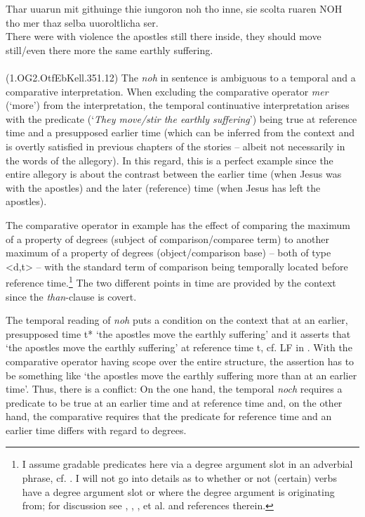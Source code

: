 \documentclass[output=paper,
modfonts
]{langscibook}
\begin{document}
\ea\gll Thar uuarun mit githuinge thie iungoron noh tho inne, sie scolta ruaren NOH tho mer thaz selba uuoroltlicha ser.\\
       There were with violence the apostles still there inside, they should move still/even there more the same earthly suffering.\\
\label{OG2_noch_mehr_ruehren} \\ (1.OG2.OtfEbKell.351.12)
\z
The \textit{noh} in sentence  is ambiguous to a temporal and a comparative interpretation. When excluding the comparative operator \textit{mer} (`more') from the interpretation, the temporal continuative interpretation arises with the predicate (`\textit{They move/stir the earthly suffering}') being true at reference time and a presupposed earlier time (which can be inferred from the context and is overtly satisfied in previous chapters of the stories -- albeit not necessarily in the words of the allegory). In this regard, this is a perfect example since the entire allegory is about the contrast between the earlier time (when Jesus was with the apostles) and the later (reference) time (when Jesus has left the apostles). 

The comparative operator in example  has the effect of comparing the maximum of a property of degrees (subject of comparison/comparee term) to another maximum of a property of degrees (object/comparison base) -- both of type <d,t> -- with the standard term of comparison being temporally located before reference time.\footnote{ I assume gradable predicates here via a degree argument slot in an adverbial phrase, cf. . I will not go into details as to whether or not (certain) verbs have a degree argument slot or where the degree argument is originating from; for discussion see \citeauthor{pinon2008} \citeyearpar{pinon2008}, \citeauthor{rett2013} \citeyearpar{rett2013}, \citeauthor{kennedy_mcnally2005} \citeyearpar{kennedy_mcnally2005}, \citeauthor{kennedy2012} \citeyearpar{kennedy2012} et al. and references therein.} The two different points in time are provided by the context since the \textit{than}-clause is covert.

The temporal reading of \textit{noh} puts a condition on the context that at an earlier, presupposed time t* `the apostles move the earthly suffering' and it asserts that `the apostles move the earthly suffering' at reference time t, cf. LF in  \citep[cf. also][]{beck2016a_sub}. With the comparative operator having scope over the entire structure, the assertion has to be something like `the apostles move the earthly suffering more than at an earlier time'. Thus, there is a conflict: On the one hand, the temporal \textit{noch} requires a predicate to be true at an earlier time and at reference time and, on the other hand, the comparative requires that the predicate for reference time and an earlier time differs with regard to degrees.
\end{document}
